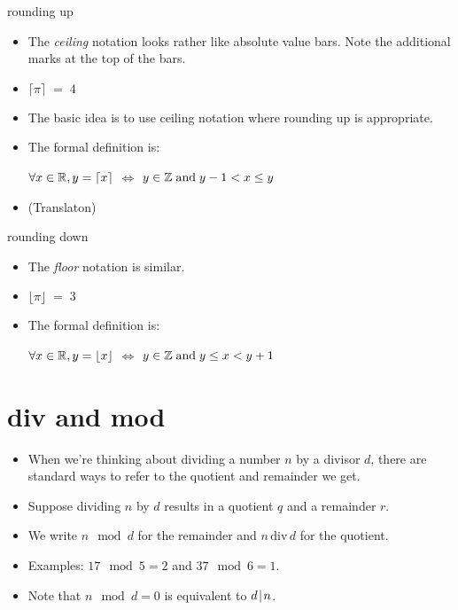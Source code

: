 \documentclass[landscape]{beamer}
\begin{document}
\begin{frame}{rounding up}
\begin{itemize}
\item The {\em ceiling} notation looks rather like absolute value bars.  Note the additional marks at the top of the bars. \pause
\item $\lceil \pi \rceil \; = \; 4$ \pause
\item The basic idea is to use ceiling notation where rounding up is appropriate. \pause

\item The formal definition is:

$ \displaystyle \forall x \in {\mathbb R}, y = \lceil x \rceil$ \hspace{8pt} $\iff$ \hspace{8pt} $y \in {\mathbb Z} \; \mbox{and} \; y-1 < x \leq y$ \pause

\item (Translaton) 
\end{itemize}
\end{frame}

\begin{frame}{rounding down}
\begin{itemize}
\item The {\em floor} notation is similar. \pause
\item $\lfloor \pi \rfloor \; = \; 3$ \pause
\item The formal definition is:

$ \displaystyle \forall x \in {\mathbb R}, y = \lfloor x \rfloor$ \hspace{8pt} $\iff$ \hspace{8pt} $y \in {\mathbb Z} \; \mbox{and} \; y \leq x < y+1$ \pause
\end{itemize}
\end{frame}


\section{div and mod}

\begin{frame}{}
\begin{itemize}
\item When we're thinking about dividing a number $n$ by a divisor $d$, there are standard ways to refer to the quotient and remainder we get. \pause
\item Suppose dividing $n$ by $d$ results in a quotient $q$ and a remainder $r$. \pause
\item We write $n \mod d$ for the remainder and $n \,\mbox{div}\, d$ for the quotient. \pause
\item Examples: $17 \mod 5 = 2$ and $37 \mod 6 = 1$. \pause
\item Note that $n \mod d = 0$ is equivalent to $d\!\mid\! n$.
\end{itemize}
\end{frame}
\end{document}
